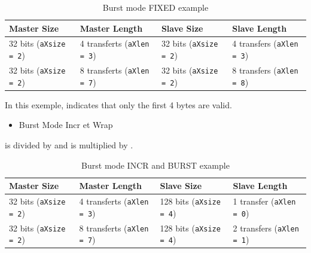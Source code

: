 \begin{table}[H]
\begin{threeparttable}
\caption{Burst mode FIXED example}
\begin{tabularx}{\linewidth}{X | X  || X | X}
\hline
\textbf{Master Size}   & \textbf{Master Length} & \textbf{Slave Size}   & \textbf{Slave Length} \\ 
\hline        
32 bits \newline (\texttt{aXsize = 2}) & 4 transferts \newline (\texttt{aXlen = 3}) & 32 bits \newline (\texttt{aXsize = 2}) & 4 transfers \newline (\texttt{aXlen = 3}) \\
\hline

32 bits \newline (\texttt{aXsize = 2}) & 8 transferts \newline (\texttt{aXlen = 7}) & 32 bits \newline (\texttt{aXsize = 2}) & 8 transfers \newline (\texttt{aXlen = 8}) \\
\hline
\end{tabularx}
\end{threeparttable}
\end{table}

In this exemple,  indicates that only the first 4 bytes are valid.

\begin{itemize}
    \item Burst Mode Incr et Wrap
\end{itemize}
 is divided by  and  is multiplied by .

\begin{table}[H]
\begin{threeparttable}
\caption{Burst mode INCR and BURST example}
\begin{tabularx}{\linewidth}{X | X  || X | X}
\hline
\textbf{Master Size}   & \textbf{Master Length} & \textbf{Slave Size}   & \textbf{Slave Length} \\ 
\hline        
32 bits \newline (\texttt{aXsize = 2}) & 4 transferts \newline (\texttt{aXlen = 3}) & 128 bits \newline (\texttt{aXsize = 4}) & 1 transfer \newline (\texttt{aXlen = 0}) \\
\hline

32 bits \newline (\texttt{aXsize = 2}) & 8 transferts \newline (\texttt{aXlen = 7}) & 128 bits \newline (\texttt{aXsize = 4}) & 2 transfers \newline (\texttt{aXlen = 1}) \\
\hline
\end{tabularx}
\end{threeparttable}
\end{table}
    



